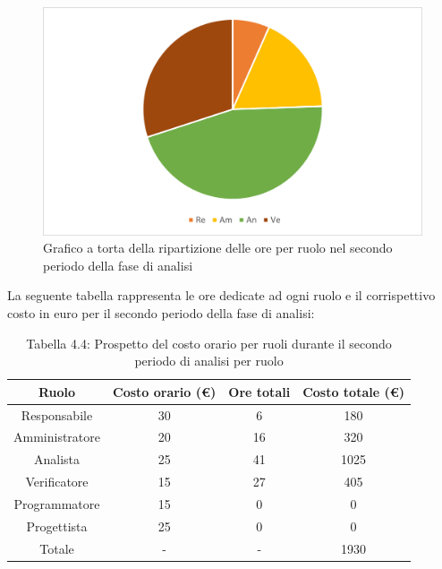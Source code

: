 \begin{figure}[H]
    \centering
    \includegraphics[scale=0.6]{img/grafi preventivo/torta/analisi/periodo2.png}
    \caption{Grafico a torta della ripartizione delle ore per ruolo nel secondo periodo della fase di analisi}
\end{figure}
La seguente tabella rappresenta le ore dedicate ad ogni ruolo e il corrispettivo costo in euro per il secondo periodo della fase di analisi:
\begin{table}[h]
	\setlength\extrarowheight{5pt}
	\centering
	\begin{tabularx}{\textwidth}{|ccc|c|}
		\hline
		\rowcolor{white}
		\textbf{Ruolo} & \textbf{Costo orario (€)} & \textbf{Ore totali} & \textbf{Costo totale (€)} \\
		\hline
		Responsabile &30&6&180 \\
		Amministratore &20&16&320 \\
		Analista &25&41&1025 \\
		Verificatore &15&27&405 \\
		Programmatore &15&0&0 \\
		Progettista &25&0&0 \\
		\hline
		Totale &-&-&1930 \\
		\hline
	\end{tabularx}
    \vspace{10pt}
	\caption{Tabella 4.4: Prospetto del costo orario per ruoli durante il secondo periodo di analisi per ruolo}
\end{table}
%
\newpage
